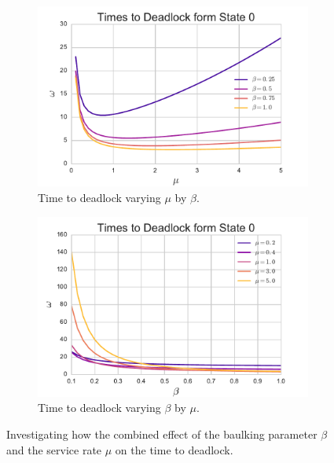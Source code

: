 \documentclass{article}
\begin{document}
\begin{figure}
\begin{center}
\begin{subfigure}[b]{0.45\textwidth}
    \includegraphics[width=\textwidth]{img/varymu_bybeta.pdf}
    \caption{Time to deadlock varying $\mu$ by $\beta$.}
    \label{fig:varymubybeta}
\end{subfigure}
\begin{subfigure}[b]{0.45\textwidth}
    \includegraphics[width=\textwidth]{img/varybeta_bymu.pdf}
    \caption{Time to deadlock varying $\beta$ by $\mu$.}
    \label{fig:varybetabymu}
\end{subfigure}
\end{center}
\caption{Investigating how the combined effect of the baulking parameter $\beta$ and the service rate $\mu$ on the time to deadlock.}
\label{fig:combinedeffect_betamu}
\end{figure}
\end{document}
